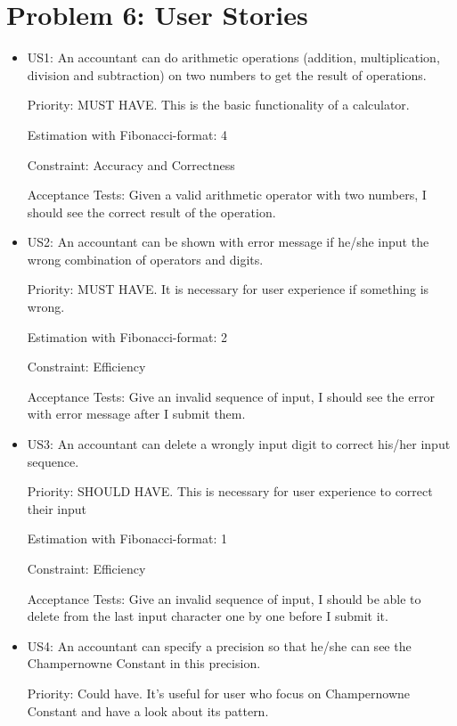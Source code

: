 \documentclass[10pt]{article}
\begin{document}
\pagebreak
\section{Problem 6: User Stories}
\begin{itemize}
    \item US1: An accountant can do arithmetic operations (addition, multiplication, division and subtraction) on two numbers to get the result of operations.
    
    Priority: MUST HAVE. This is the basic functionality of a calculator.
    
    Estimation with Fibonacci-format: 4
    
    Constraint: Accuracy and Correctness
    
    Acceptance Tests: Given a valid arithmetic operator with two numbers, I should see the correct result of the operation.
    
    \item US2: An accountant can be shown with error message if he/she input the wrong combination of operators and digits.
    
    Priority: MUST HAVE. It is necessary for user experience if something is wrong.
    
    Estimation with Fibonacci-format: 2
    
    Constraint: Efficiency
    
    Acceptance Tests: Give an invalid sequence of input, I should see the error with error message after I submit them.
    
    \item US3: An accountant can delete a wrongly input digit to correct his/her input sequence.
    
    Priority: SHOULD HAVE. This is necessary for user experience to correct their input
    
    Estimation with Fibonacci-format: 1 
    
    Constraint: Efficiency
    
    Acceptance Tests: Give an invalid sequence of input, I should be able to delete from the last input character one by one before I submit it.
    
    \item US4: An accountant can specify a precision so that he/she can see the Champernowne Constant in this precision. 
    
    Priority: Could have. It's useful for user who focus on Champernowne Constant and have a look about its pattern.
    

\end{itemize}
\end{document}
